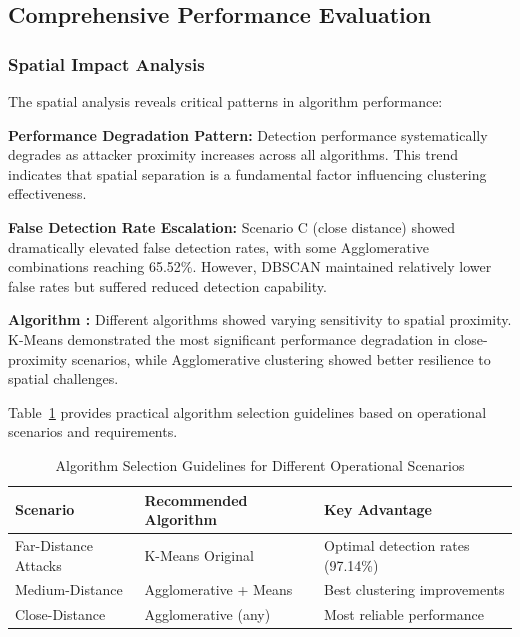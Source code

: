 \documentclass[pdflatex,sn-mathphys-num]{sn-jnl}%
\theoremstyle{thmstyleone}
\theoremstyle{thmstyletwo}
\theoremstyle{thmstylethree}
\begin{document}



\subsection{Comprehensive Performance Evaluation}

\subsubsection{Spatial Impact Analysis}

The spatial analysis reveals critical patterns in algorithm performance:

\textbf{Performance Degradation Pattern:} Detection performance systematically degrades as attacker proximity increases across all algorithms. This trend indicates that spatial separation is a fundamental factor influencing clustering effectiveness.

\textbf{False Detection Rate Escalation:} Scenario C (close distance) showed dramatically elevated false detection rates, with some Agglomerative combinations reaching 65.52\%. However, DBSCAN maintained relatively lower false rates but suffered reduced detection capability.

\textbf{Algorithm :} Different algorithms showed varying sensitivity to spatial proximity. K-Means demonstrated the most significant performance degradation in close-proximity scenarios, while Agglomerative clustering showed better resilience to spatial challenges.

Table~\ref{tab:algorithm_guidelines} provides practical algorithm selection guidelines based on operational scenarios and requirements.

\begin{table}[!t]
\renewcommand{\arraystretch}{1.3}
\caption{Algorithm Selection Guidelines for Different Operational Scenarios}
\label{tab:algorithm_guidelines}
\centering
\begin{tabular}{|l|l|l|}
\toprule
\textbf{Scenario} & \textbf{Recommended Algorithm} & \textbf{Key Advantage} \\
\midrule
Far-Distance Attacks & K-Means Original & Optimal detection rates (97.14\%) \\
Medium-Distance & Agglomerative + Means & Best clustering improvements \\
Close-Distance & Agglomerative (any) & Most reliable performance \\

\bottomrule
\end{tabular}
\end{table}
\end{document}
